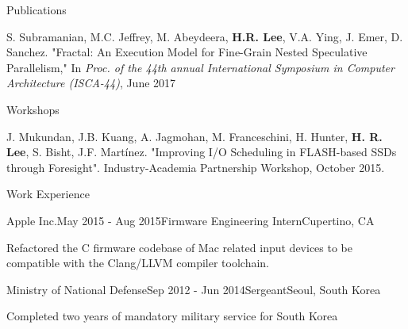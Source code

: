 \documentclass{resume} %
\begin{document}

\begin{rSection}{Publications}

S. Subramanian, M.C. Jeffrey, M. Abeydeera, {\bf H.R. Lee}, V.A. Ying, J. Emer, D. Sanchez. 
"Fractal: An Execution Model for Fine-Grain Nested Speculative Parallelism,"
In \textit{Proc. of the 44th annual International Symposium in Computer Architecture (ISCA-44)}, June 2017

\end{rSection}


\begin{rSection}{Workshops}

J. Mukundan, J.B. Kuang, A. Jagmohan, M. Franceschini, H. Hunter, {\bf H. R. Lee}, S. Bisht, J.F. Martínez. "Improving I/O Scheduling in FLASH-based SSDs through Foresight". Industry-Academia Partnership Workshop, October 2015.

\end{rSection}


\begin{rSection}{Work Experience}

\begin{rSubsection}{Apple Inc.}{May 2015 - Aug 2015}{Firmware Engineering Intern}{Cupertino, CA}

\item Refactored the C firmware codebase of Mac related input devices to be compatible with the Clang/LLVM compiler toolchain. 
\end{rSubsection}

\begin{rSubsection}{Ministry of National Defense}{Sep 2012 - Jun 2014}{Sergeant}{Seoul, South Korea}

\item Completed two years of mandatory military service for South Korea
\end{rSubsection}

\end{rSection}
\end{document}
